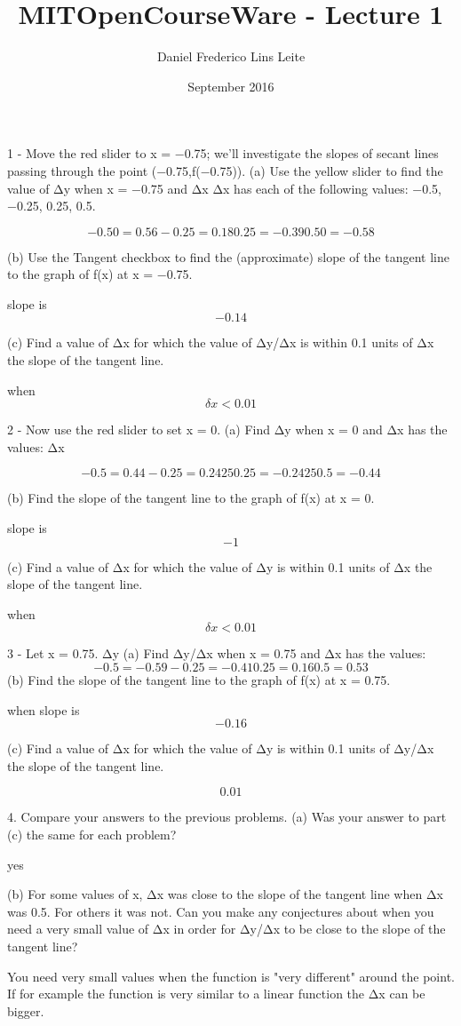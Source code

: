 \documentclass{article}
\title{MITOpenCourseWare - Lecture 1}
\author{Daniel Frederico Lins Leite}
\date{September 2016}
\begin{document}
\maketitle
	
1 - Move the red slider to x = −0.75; we’ll investigate the slopes of secant lines passing through the point (−0.75,f(−0.75)).
(a) Use the yellow slider to find the value of Δy when x = −0.75 and Δx Δx has each of the following values: −0.5, −0.25, 0.25, 0.5.

\[
-0.50 = 0.56
-0.25 = 0.18
0.25 = -0.39
0.50 = -0.58
\]

(b) Use the Tangent checkbox to find the (approximate) slope of the tangent line to the graph of f(x) at x = −0.75.

slope is $$-0.14$$

(c) Find a value of Δx for which the value of Δy/Δx
is within 0.1 units of Δx the slope of the tangent line.

when $$\delta x < 0.01$$

2 - Now use the red slider to set x = 0.
(a) Find Δy when x = 0 and Δx has the values: 
Δx

\[
−0.5 = 0.44
−0.25 = 0.2425
0.25 = -0.2425
0.5 = -0.44
\]

(b) Find the slope of the tangent line to the graph of f(x) at x = 0.

slope is $$-1$$

(c) Find a value of Δx for which the value of Δy is within 0.1 units of Δx the slope of the tangent line.

when $$\delta x < 0.01$$

3 - Let x = 0.75. Δy 
(a) Find Δy/Δx when x = 0.75 and Δx has the values:
\[
−0.5 = -0.59
−0.25 = -0.41
0.25 = 0.16
0.5 = 0.53
\]
(b) Find the slope of the tangent line to the graph of f(x) at x = 0.75.

when slope is $$-0.16$$

(c) Find a value of Δx for which the value of Δy is within 0.1 units of Δy/Δx the slope of the tangent line.

$$0.01$$

4. Compare your answers to the previous problems.
(a) Was your answer to part (c) the same for each problem? 

yes

(b) For some values of x, Δx was close to the slope of the tangent line when Δx was 0.5. For others it was not. Can you make any conjec­tures about when you need a very small value of Δx in order for Δy/Δx to be close to the slope of the tangent line?

You need very small values when the function is "very different" around the point. If for example the function is very similar to a linear function the Δx can be bigger.
\end{document}
